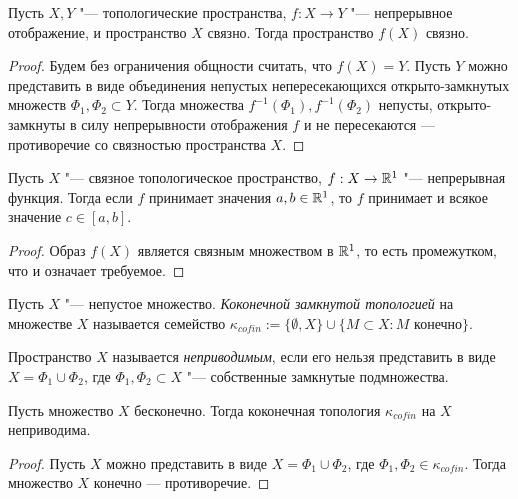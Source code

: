 \begin{theorem}\label{theoremmain}
	Пусть $X, Y$ "--- топологические пространства, $f : X \to Y$ "--- непрерывное отображение, и пространство $X$ связно. Тогда пространство $f(X)$ связно.
\end{theorem}

\begin{proof}
	Будем без ограничения общности считать, что $f(X) = Y$. Пусть $Y$ можно представить в виде объединения непустых непересекающихся открыто-замкнутых множеств $\Phi_1, \Phi_2 \subset Y$. Тогда множества $f^{-1}(\Phi_1), f^{-1}(\Phi_2)$ непусты, открыто-замкнуты в силу непрерывности отображения $f$ и не пересекаются --- противоречие со связностью пространства $X$.
\end{proof}

\begin{corollary}
	Пусть $X$ "--- связное топологическое пространство, $f : X \to \mathbb{R}^1$ "--- непрерывная функция. Тогда если $f$ принимает значения $a, b \in \mathbb{R}^1$, то $f$ принимает и всякое значение $c \in [a, b]$.
\end{corollary}

\begin{proof}
	Образ $f(X)$ является связным множеством в $\mathbb{R}^1$, то есть промежутком, что и означает требуемое.
\end{proof}

\begin{definition}
	Пусть $X$ "--- непустое множество. \textit{Коконечной замкнутой топологией} на множестве $X$ называется семейство $\kappa_{cofin} := \{\emptyset, X\} \cup \{M \subset X : M \text{ конечно}\}$.
\end{definition}

\begin{definition}
	Пространство $X$ называется \textit{неприводимым}, если его нельзя представить в виде $X = \Phi_1 \cup \Phi_2$, где $\Phi_1, \Phi_2 \subset X$ "--- собственные замкнутые подмножества.
\end{definition}

\begin{theorem}
	Пусть множество $X$ бесконечно. Тогда коконечная топология $\kappa_{cofin}$ на $X$ неприводима.
\end{theorem}

\begin{proof}
	Пусть $X$ можно представить в виде $X = \Phi_1 \cup \Phi_2$, где $\Phi_1, \Phi_2 \in \kappa_{cofin}$. Тогда множество $X$ конечно --- противоречие.
\end{proof}

